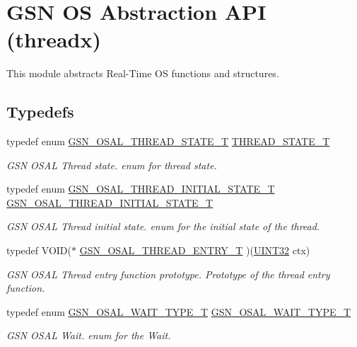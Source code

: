 \hypertarget{a00628}{
\section{GSN OS Abstraction API (threadx)}
\label{a00628}
}


This module abstracts Real-\/Time OS functions and structures.  


\subsection*{Typedefs}
\begin{DoxyCompactItemize}
\item 
typedef enum \hyperlink{a00628_gae961839651f7d7d0065cca8c4efb88f6}{GSN\_\-OSAL\_\-THREAD\_\-STATE\_\-T} \hyperlink{a00628_gac436a5e128feda97ba01f557f15bcc57}{THREAD\_\-STATE\_\-T}
\begin{DoxyCompactList}\small\item\em GSN OSAL Thread state. enum for thread state. \end{DoxyCompactList}\item 
typedef enum \hyperlink{a00628_ga0aaa82e357c4ce95100dc1df18ec3363}{GSN\_\-OSAL\_\-THREAD\_\-INITIAL\_\-STATE\_\-T} \hyperlink{a00628_gab9843a3f99a06459775b3380ed83f17d}{GSN\_\-OSAL\_\-THREAD\_\-INITIAL\_\-STATE\_\-T}
\begin{DoxyCompactList}\small\item\em GSN OSAL Thread initial state. enum for the initial state of the thread. \end{DoxyCompactList}\item 
typedef VOID($\ast$ \hyperlink{a00628_ga62a09641cac90719fc0cdb5f204df09b}{GSN\_\-OSAL\_\-THREAD\_\-ENTRY\_\-T} )(\hyperlink{a00660_gae1e6edbbc26d6fbc71a90190d0266018}{UINT32} ctx)
\begin{DoxyCompactList}\small\item\em GSN OSAL Thread entry function prototype. Prototype of the thread entry function. \end{DoxyCompactList}\item 
typedef enum \hyperlink{a00628_ga5568febc25b2751efc49a3eddcee65f5}{GSN\_\-OSAL\_\-WAIT\_\-TYPE\_\-T} \hyperlink{a00628_gae40be9afbdb44361f83e67879b2ac566}{GSN\_\-OSAL\_\-WAIT\_\-TYPE\_\-T}
\begin{DoxyCompactList}\small\item\em GSN OSAL Wait. enum for the Wait. \end{DoxyCompactList}\item 

\end{DoxyCompactItemize}
